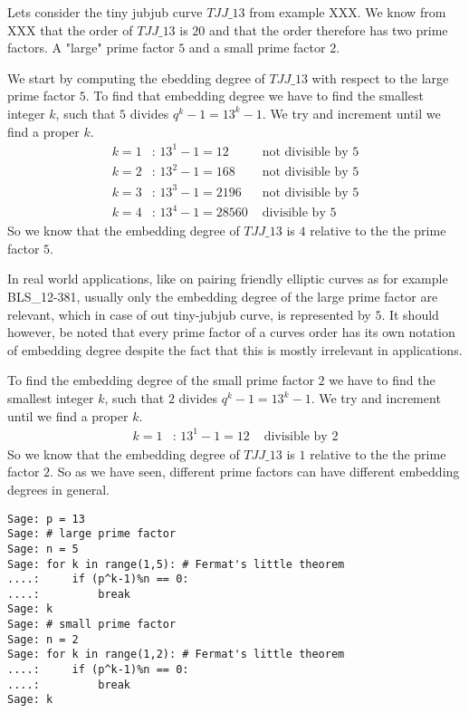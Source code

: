 \begin{example} Lets consider the tiny jubjub curve $\mathit{TJJ\_13}$ from example XXX. We know from XXX that the order of $\mathit{TJJ\_13}$ is $20$ and that the order therefore has two prime factors. A "large" prime factor $5$ and a small prime factor $2$. 

We start by computing the ebedding degree of $\mathit{TJJ\_13}$ with respect to the large prime factor $5$. To find that embedding degree we have to find the smallest integer $k$, such that $5$ divides $q^k-1= 13^k-1$. We try and increment until we find a proper $k$. 
\begin{align*}
k=1 &\text{: } 13^1-1 = 12 & \text{ not divisible by } 5\\ 
k=2 &\text{: } 13^2-1 = 168 & \text{ not divisible by } 5\\ 
k=3 &\text{: } 13^3-1 = 2196 & \text{ not divisible by } 5\\ 
k=4 &\text{: } 13^4-1 = 28560 & \text{ divisible by } 5
\end{align*} 
So we know that the embedding degree of $\mathit{TJJ\_13}$ is $4$ relative to the the prime factor $5$.


In real world applications, like on pairing friendly elliptic curves as for example BLS\_12-381, usually only the embedding degree of the large prime factor are relevant, which in case of out tiny-jubjub curve, is represented by $5$. It should however, be noted that every prime factor of a curves order has its own notation of embedding degree despite the fact that this is mostly irrelevant in applications.

To find the embedding degree of the small prime factor $2$ we have to find the smallest integer $k$, such that $2$ divides $q^k-1= 13^k-1$. We try and increment until we find a proper $k$. 
\begin{align*}
k=1 &\text{: } 13^1-1 = 12 & \text{ divisible by } 2
\end{align*} 
So we know that the embedding degree of $\mathit{TJJ\_13}$ is $1$ relative to the the prime factor $2$. So as we have seen, different prime factors can have different embedding degrees in general.
\begin{verbatim}
Sage: p = 13
Sage: # large prime factor
Sage: n = 5
Sage: for k in range(1,5): # Fermat's little theorem
....:     if (p^k-1)%n == 0:
....:         break
Sage: k
Sage: # small prime factor
Sage: n = 2
Sage: for k in range(1,2): # Fermat's little theorem
....:     if (p^k-1)%n == 0:
....:         break
Sage: k
\end{verbatim}
\end{example}

